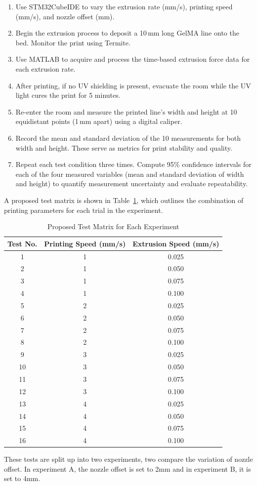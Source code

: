 \begin{enumerate}
    \item Use STM32CubeIDE to vary the extrusion rate (mm/s), printing speed (mm/s), and nozzle offset (mm).
    \item Begin the extrusion process to deposit a 10\,mm long GelMA line onto the bed. Monitor the print using Termite.
    \item Use MATLAB to acquire and process the time-based extrusion force data for each extrusion rate.
    \item After printing, if no UV shielding is present, evacuate the room while the UV light cures the print for 5 minutes.
    \item Re-enter the room and measure the printed line’s width and height at 10 equidistant points (1\,mm apart) using a digital caliper.
    \item Record the mean and standard deviation of the 10 measurements for both width and height. These serve as metrics for print stability and quality.
    \item Repeat each test condition three times. Compute 95\% confidence intervals for each of the four measured variables (mean and standard deviation of width and height) to quantify measurement uncertainty and evaluate repeatability.
\end{enumerate}

A proposed test matrix is shown in Table~\ref{tab:testmatrix}, which outlines the combination of printing parameters for each trial in the experiment.

\begin{longtable}{ccc}
\caption{Proposed Test Matrix for Each Experiment} \label{tab:testmatrix} \\
\hline
\textbf{Test No.} & \textbf{Printing Speed (mm/s)} & \textbf{Extrusion Speed (mm/s)} \\
\hline
1  & 1 & 0.025 \\
2  & 1 & 0.050 \\
3  & 1 & 0.075 \\
4  & 1 & 0.100 \\
5  & 2 & 0.025 \\
6  & 2 & 0.050 \\
7  & 2 & 0.075 \\
8  & 2 & 0.100 \\
9  & 3 & 0.025 \\
10 & 3 & 0.050 \\
11 & 3 & 0.075 \\
12 & 3 & 0.100 \\
13 & 4 & 0.025 \\
14 & 4 & 0.050 \\
15 & 4 & 0.075 \\
16 & 4 & 0.100 \\
\hline
\end{longtable}
These tests are split up into two experiments, two compare the variation of nozzle offset. In experiment A, the nozzle offset is set to 2mm and in experiment B, it is set to 4mm.

